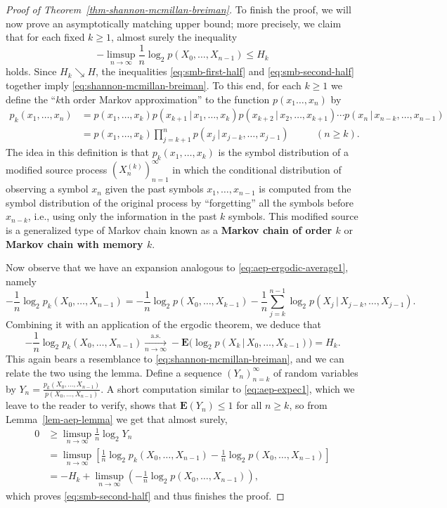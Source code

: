 \documentclass[12pt]{article}
\newcommand{\expec}{\mathbf{E}}
\theoremstyle{example}
\begin{document}
\begin{proof}[Proof of Theorem~\ref{thm-shannon-mcmillan-breiman}]
To finish the proof, we will now prove an asymptotically matching upper bound; more precisely, we claim that for each fixed $k\ge1$, almost surely the inequality
\begin{equation} \label{eq:smb-second-half}
-\limsup_{n\to\infty} \frac{1}{n} \log_2 p(X_0,\ldots,X_{n-1}) \le H_k
\end{equation}
holds. Since $H_k \searrow H$, the inequalities \eqref{eq:smb-first-half} and \eqref{eq:smb-second-half} together imply \eqref{eq:shannon-mcmillan-breiman}.
To this end, for each $k\ge 1$ we define the ``$k$th order Markov approximation'' to the function $p(x_1\ldots,x_n)$ by
\begin{align*}
 p_k(x_1,\ldots,x_n) &= p(x_1,\ldots,x_k) p(x_{k+1}\,|\,x_1,\ldots,x_k)
p(x_{k+2}\,|\,x_2,\ldots,x_{k+1}) \cdots p(x_n\,|\, x_{n-k},\ldots, x_{n-1}) \\ &= p(x_1,\ldots,x_k)
\prod_{j=k+1}^n p(x_j\,|\, x_{j-k},\ldots,x_{j-1}) \qquad \ \ \ (n\ge k).
\end{align*}
The idea in this definition is that $p_k(x_1,\ldots,x_k)$ is the symbol distribution of a modified source process $(X_n^{(k)})_{n=1}^\infty$ in which the conditional distribution of observing a symbol $x_n$ given the past symbols $x_1,\ldots,x_{n-1}$ is computed from the symbol distribution of the original process by ``forgetting'' all the symbols before $x_{n-k}$, i.e., using only the information in the past $k$ symbols. This modified source is a generalized type of Markov chain known as a \textbf{Markov chain of order $k$} or \textbf{Markov chain with memory $k$}.

Now observe that we have an expansion analogous to \eqref{eq:aep-ergodic-average1}, namely
$$
-\frac{1}{n} \log_2 p_k(X_0,\ldots,X_{n-1}) = -\frac{1}{n} \log_2 p(X_0,\ldots,X_{k-1}) - \frac{1}{n} \sum_{j=k}^{n-1} \log_2 p(X_j\,|\,X_{j-k},\ldots,X_{j-1}).
$$
Combining it with an application of the ergodic theorem, we deduce that
$$
-\frac{1}{n} \log_2 p_k(X_0,\ldots,X_{n-1}) \xrightarrow[n\to\infty]{\textrm{a.s.}} -\expec \big(\log_2 p(X_k\,|\,X_0,\ldots,X_{k-1})\big) = H_k.
$$
This again bears a resemblance to \eqref{eq:shannon-mcmillan-breiman}, and we can relate the two using the lemma. Define a sequence $(Y_n)_{n=k}^\infty$ of random variables by $Y_n = \frac{p_k(X_0,\ldots,X_{n-1})}{p(X_0,\ldots,X_{n-1})}$. A short computation similar to \eqref{eq:aep-expec1}, which we leave to the reader to verify, shows that $\expec(Y_n) \le 1$ for all $n\ge k$, so from Lemma~\ref{lem-aep-lemma} we get that almost surely,
\begin{align*}
0 &\ge \limsup_{n\to\infty} \frac{1}{n} \log_2 Y_n 
 \\ &= \limsup_{n\to\infty} \left[
\frac{1}{n} \log_2 p_k(X_0,\ldots,X_{n-1}) - \frac{1}{n}\log_2 p(X_0,\ldots,X_{n-1}) \right]
\\ &=
-H_k + \limsup_{n\to\infty} \left(- \frac{1}{n}\log_2 p(X_0,\ldots,X_{n-1}) \right),
\end{align*}
which proves \eqref{eq:smb-second-half} and thus finishes the proof.
\end{proof}
\end{document}
